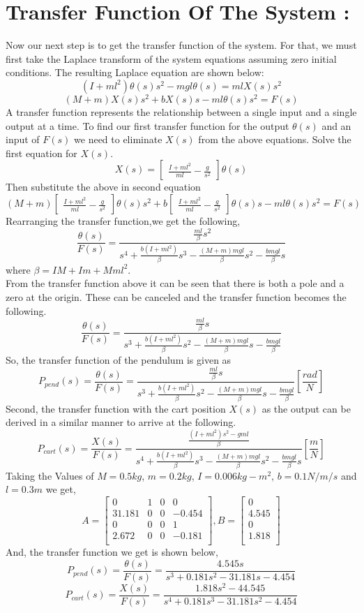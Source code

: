 \documentclass[11pt]{article}
\begin{document}
\section{Transfer Function Of The System :}
{Now our next step is to get the transfer function of the system. For that, we must first take the Laplace transform of the system equations assuming zero initial conditions. The resulting Laplace equation are shown below:}
$$(I+ml^2)\theta(s)s^2 - mgl\theta(s) = mlX(s)s^2$$
$$(M+m)X(s)s^2+bX(s)s-ml\theta(s)s^2=F(s)$$
{A transfer function represents the relationship between a single input and a single output at a time. To find our first transfer function for the output $\theta(s)$ and an input of $F(s)$ we need to eliminate $X(s)$ from the above equations. Solve the first equation for $X(s)$.}
$$X(s)=\begin{bmatrix}\frac{I+ml^2}{ml}-\frac{g}{s^2}\end{bmatrix}\theta(s)$$
{Then substitute the above in second equation}
$$(M+m)\begin{bmatrix}\frac{I+ml^2}{ml}-\frac{g}{s^2}\end{bmatrix}\theta(s)s^2+b\begin{bmatrix}\frac{I+ml^2}{ml}-\frac{g}{s^2}\end{bmatrix}\theta(s)s-ml\theta(s)s^2=F(s)$$
{Rearranging the transfer function,we get the following,}
$$\frac{\theta(s)}{F(s)}=\frac{\frac{ml}{\beta}s^2}{s^4+\frac{b(I+ml^2)}{\beta}s^3-\frac{(M+m)mgl}{\beta}s^2-\frac{bmgl}{\beta}s}$$
{where $\beta=IM+Im+Mml^2$.\\}
{From the transfer function above it can be seen that there is both a pole and a zero at the origin. These can be canceled and the transfer function becomes the following.}
$$\frac{\theta(s)}{F(s)}=\frac{\frac{ml}{\beta}s}{s^3+\frac{b(I+ml^2)}{\beta}s^2-\frac{(M+m)mgl}{\beta}s-\frac{bmgl}{\beta}}$$
{So, the transfer function of the pendulum is given as}
$$P_{pend}(s)=\frac{\theta(s)}{F(s)}=\frac{\frac{ml}{\beta}s}{s^3+\frac{b(I+ml^2)}{\beta}s^2-\frac{(M+m)mgl}{\beta}s-\frac{bmgl}{\beta}}   [\frac{rad}{N}]$$
{Second, the transfer function with the cart position $X(s)$ as the output can be derived in a similar manner to arrive at the following.}
$$P_{cart}(s)=\frac{X(s)}{F(s)}=\frac{\frac{(I+ml^2)s^2-gml}{\beta}}{s^4+\frac{b(I+ml^2)}{\beta}s^3-\frac{(M+m)mgl}{\beta}s^2-\frac{bmgl}{\beta}s}[\frac{m}{N}]$$
{Taking the Values of $M=0.5kg$, $m=0.2kg$, $I=0.006kg-m^2$, $b=0.1N/m/s$ and $l=0.3m$ we get, }
$$A=\begin{bmatrix}
0&1&0&0\\
31.181&0&0&-0.454\\
0&0&0&1\\
2.672&0&0&-0.181\\
\end{bmatrix},
B=\begin{bmatrix}
0\\4.545\\0\\1.818\\
\end{bmatrix}$$
{And, the transfer function we get is shown below,}
$$P_{pend}(s)=\frac{\theta(s)}{F(s)}=\frac{4.545s}{s^3+0.181s^2-31.181s-4.454}$$
$$P_{cart}(s)=\frac{X(s)}{F(s)}=\frac{1.818s^2-44.545}{s^4+0.181s^3-31.181s^2-4.454}$$
\end{document}
